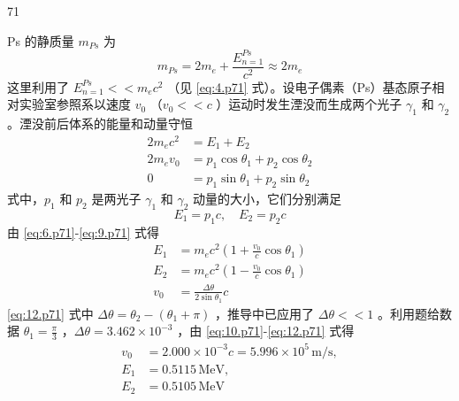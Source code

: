 \begin{solution}{71}
\begin{subsolution}
    \end{subsolution}
    \begin{subsolution}
        \begin{subsubsolution}
            Ps 的静质量 $m_{Ps}$ 为
            \begin{equation}
                m_{Ps} = 2m_{e} + \frac{E_{n=1}^{Ps}}{c^{2}} \approx 2m_{e} \label{eq:5.p71}
            \end{equation}
            这里利用了 $E_{n=1}^{Ps} << m_{e}c^{2}$ （见 \eqref{eq:4.p71} 式）。设电子偶素（Ps）基态原子相对实验室参照系以速度 $v_{0}$ （$v_{0} << c$ ）运动时发生湮没而生成两个光子 $\gamma_{1}$ 和 $\gamma_{2}$ 。湮没前后体系的能量和动量守恒
            \begin{align}
                2m_{e}c^{2} &= E_{1} + E_{2} \label{eq:6.p71} \\
                2m_{e}v_{0} &= p_{1}\cos\theta_{1} + p_{2}\cos\theta_{2} \label{eq:7.p71} \\
                0 &= p_{1}\sin\theta_{1} + p_{2}\sin\theta_{2} \label{eq:8.p71}
            \end{align}
            式中，$p_{1}$ 和 $p_{2}$ 是两光子 $\gamma_{1}$ 和 $\gamma_{2}$ 动量的大小，它们分别满足
            \begin{equation}
                E_{1} = p_{1}c,\quad E_{2} = p_{2}c \label{eq:9.p71}
            \end{equation}
            由 \eqref{eq:6.p71}-\eqref{eq:9.p71} 式得
            \begin{align}
                E_{1} &= m_{e}c^{2}\left(1 + \frac{v_{0}}{c}\cos\theta_{1}\right) \label{eq:10.p71} \\
                E_{2} &= m_{e}c^{2}\left(1 - \frac{v_{0}}{c}\cos\theta_{1}\right) \label{eq:11.p71} \\
                v_{0} &= \frac{\Delta\theta}{2\sin\theta_{1}} c \label{eq:12.p71}
            \end{align}
            \eqref{eq:12.p71} 式中 $\Delta\theta = \theta_{2} - (\theta_{1} + \pi)$ ，推导中已应用了 $\Delta\theta << 1$ 。利用题给数据 $\theta_{1} = \frac{\pi}{3}$ ，$\Delta\theta = 3.462 \times 10^{-3}$ ，由 \eqref{eq:10.p71}-\eqref{eq:12.p71} 式得
            \begin{align}
                v_{0} &= 2.000 \times 10^{-3} c = 5.996 \times 10^{5}\,\mathrm{m/s}, \nonumber \\
                E_{1} &= 0.5115\,\mathrm{MeV}, \nonumber \\
                E_{2} &= 0.5105\,\mathrm{MeV} \label{eq:13.p71}

\end{align}
\end{subsubsolution}
\end{subsolution}
\end{solution}

